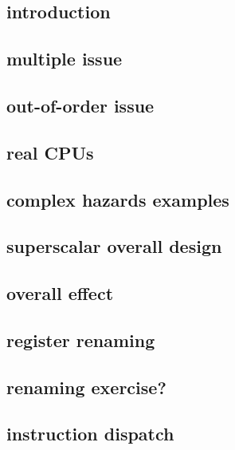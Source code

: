 
\subsection{introduction}

\subsection{multiple issue}


\subsection{out-of-order issue}


\subsection{real CPUs}


\subsection{complex hazards examples}

\subsection{superscalar overall design}



\subsection{overall effect}


\subsection{register renaming}



\subsection{renaming exercise?}


\subsection{instruction dispatch}


